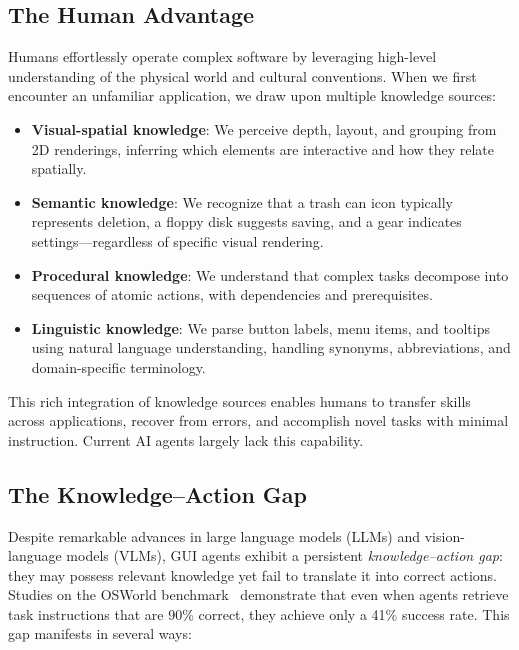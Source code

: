 \documentclass[11pt]{article}
\begin{document}
\subsection{The Human Advantage}

Humans effortlessly operate complex software by leveraging high-level understanding of the physical world and cultural conventions. When we first encounter an unfamiliar application, we draw upon multiple knowledge sources:

\begin{itemize}
    \item \textbf{Visual-spatial knowledge}: We perceive depth, layout, and grouping from 2D renderings, inferring which elements are interactive and how they relate spatially.
    \item \textbf{Semantic knowledge}: We recognize that a trash can icon typically represents deletion, a floppy disk suggests saving, and a gear indicates settings---regardless of specific visual rendering.
    \item \textbf{Procedural knowledge}: We understand that complex tasks decompose into sequences of atomic actions, with dependencies and prerequisites.
    \item \textbf{Linguistic knowledge}: We parse button labels, menu items, and tooltips using natural language understanding, handling synonyms, abbreviations, and domain-specific terminology.
\end{itemize}

This rich integration of knowledge sources enables humans to transfer skills across applications, recover from errors, and accomplish novel tasks with minimal instruction. Current AI agents largely lack this capability.

\subsection{The Knowledge--Action Gap}

Despite remarkable advances in large language models (LLMs) and vision-language models (VLMs), GUI agents exhibit a persistent \textit{knowledge--action gap}: they may possess relevant knowledge yet fail to translate it into correct actions. Studies on the OSWorld benchmark~\cite{osworld2024} demonstrate that even when agents retrieve task instructions that are 90\% correct, they achieve only a 41\% success rate. This gap manifests in several ways:
\end{document}
